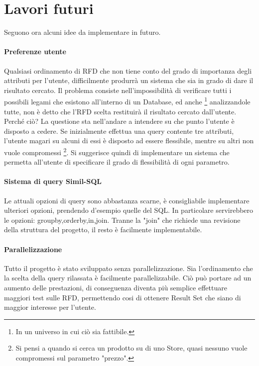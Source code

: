 \section{Lavori futuri}
Seguono ora alcuni idee da implementare in futuro.
\paragraph{Preferenze utente}
Qualsiasi ordinamento di RFD che non tiene conto del grado di importanza degli attributi per l'utente, difficilmente produrrà un sistema che sia in grado di dare il risultato cercato.
Il problema consiste nell'impossibilità di verificare tutti i possibili legami che esistono all'interno di un Database, ed anche \footnote{In un universo in cui ciò sia fattibile.} analizzandole tutte, non è detto che l'RFD scelta restituirà il risultato cercato dall'utente. Perché ciò?
La questione sta nell'andare a intendere su che punto l'utente è disposto a cedere. Se inizialmente effettua una query contente tre attributi, l'utente magari su alcuni di essi è disposto ad essere flessibile, mentre su altri non vuole compromessi \footnote{Si pensi a quando si cerca un prodotto su di uno Store, quasi nessuno vuole compromessi sul parametro "prezzo".}.
Si suggerisce quindi di implementare un sistema che permetta all'utente di specificare il grado di flessibilità di ogni parametro.
\paragraph{Sistema di query Simil-SQL}
Le attuali opzioni di query sono abbastanza scarne, è consigliabile implementare ulteriori opzioni, prendendo d'esempio quelle del SQL. In particolare servirebbero le opzioni: groupby,orderby,in,join.
Tranne la "join" che richiede una revisione della struttura del progetto, il resto è facilmente implementabile.
\paragraph{Parallelizzazione}
Tutto il progetto è stato sviluppato senza parallelizzazione. Sia l'ordinamento che la scelta della query rilassata è facilmente parallelizzabile. Ciò può portare ad un aumento delle prestazioni, di conseguenza diventa più semplice effettuare maggiori test sulle RFD, permettendo cosi di ottenere Result Set che siano di maggior interesse per l'utente.